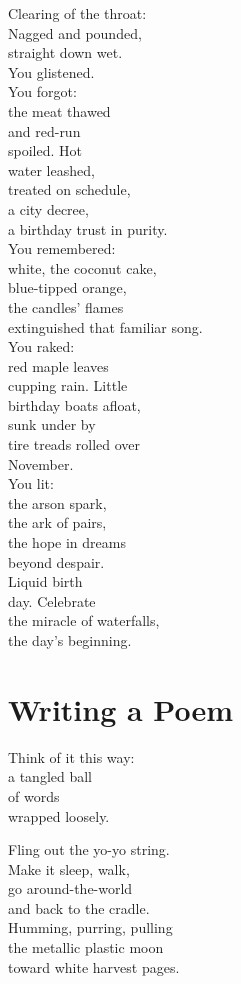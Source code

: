 \documentclass[twoside,10pt]{book}
\begin{document}
Clearing of the throat:\\
Nagged and pounded,\\
straight down wet.\\
You glistened.\\
You forgot:\\
the meat thawed\\
and red-run\\
spoiled. Hot\\
water leashed,\\
treated on schedule,\\
a city decree,\\
a birthday trust in purity.\\
You remembered:\\
white, the coconut cake,\\
blue-tipped orange,\\
the candles' flames\\
extinguished that familiar song.\\
You raked:\\
red maple leaves\\
cupping rain. Little\\
birthday boats afloat,\\
sunk under by\\
tire treads rolled over\\
November.\\
You lit:\\
the arson spark,\\
the ark of pairs,\\
the hope in dreams\\
beyond despair.\\
Liquid birth\\
day. Celebrate\\
the miracle of waterfalls,\\
the day's beginning.


\clearpage
\section{Writing a Poem}

Think of it this way:\\
a tangled ball\\
of words\\
wrapped loosely.

Fling out the yo-yo string.\\
Make it sleep, walk,\\
go around-the-world\\
and back to the cradle.\\
Humming, purring, pulling\\
the metallic plastic moon\\
toward white harvest pages.
\end{document}
